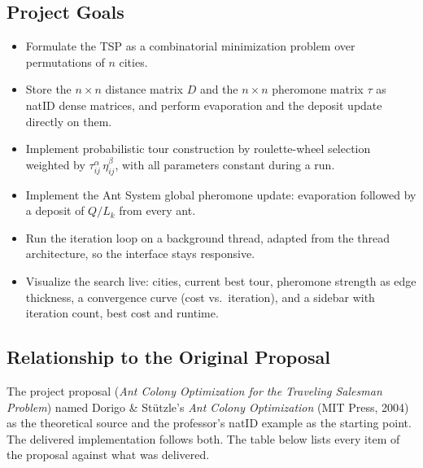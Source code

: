 \documentclass[11pt,a4paper]{article}
\begin{document}
\subsection{Project Goals}
\begin{itemize}
  \item Formulate the TSP as a combinatorial minimization problem over permutations of $n$ cities.
  \item Store the $n\times n$ distance matrix $D$ and the $n\times n$ pheromone matrix $\tau$ as natID
        dense matrices, and perform evaporation and the deposit update directly on them.
  \item Implement probabilistic tour construction by roulette-wheel selection weighted by
        $\tau_{ij}^{\alpha}\,\eta_{ij}^{\beta}$, with all parameters constant during a run.
  \item Implement the Ant System global pheromone update: evaporation followed by a deposit of $Q/L_k$
        from every ant.
  \item Run the iteration loop on a background thread, adapted from the  thread
        architecture, so the interface stays responsive.
  \item Visualize the search live: cities, current best tour, pheromone strength as edge thickness, a
        convergence curve (cost vs.\ iteration), and a sidebar with iteration count, best cost and
        runtime.
\end{itemize}

\subsection{Relationship to the Original Proposal}
The project proposal (\emph{Ant Colony Optimization for the Traveling Salesman Problem}) named Dorigo \&
Stützle's \emph{Ant Colony Optimization} (MIT Press, 2004) as the theoretical source and the professor's
natID example  as the starting point. The delivered implementation follows both. The
table below lists every item of the proposal against what was delivered.
\end{document}
